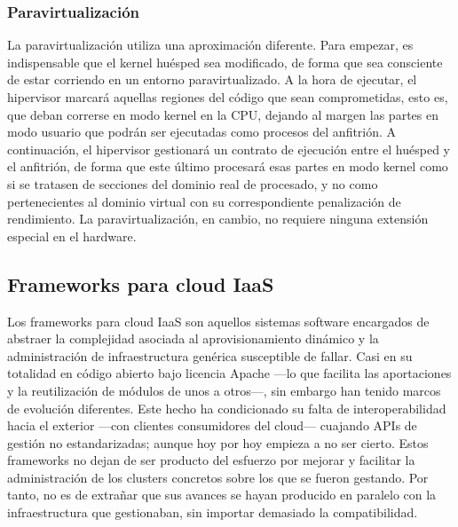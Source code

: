 \subsubsection{Paravirtualizaci\'on}\label{subsubsec:paravirt}

\noindent La paravirtualizaci\'on utiliza una aproximaci\'on diferente. Para empezar, es indispensable que el kernel hu\'esped sea modificado, de forma que sea consciente de estar corriendo en un entorno paravirtualizado. A la hora de ejecutar, el hipervisor marcar\'a aquellas regiones del c\'odigo que sean comprometidas, esto es, que deban correrse en modo kernel en la CPU, dejando al margen las partes en modo usuario que podr\'an ser ejecutadas como procesos del anfitri\'on. A continuaci\'on, el hipervisor gestionar\'a un contrato de ejecuci\'on entre el hu\'esped y el anfitri\'on, de forma que este \'ultimo procesar\'a esas partes en modo kernel como si se tratasen de secciones del dominio real de procesado, y no como pertenecientes al dominio virtual con su correspondiente penalizaci\'on de rendimiento. La paravirtualizaci\'on, en cambio, no requiere ninguna extensi\'on especial en el hardware.\newline


\subsection{Frameworks para cloud IaaS}\label{subsec:frameworksiaas}

\noindent Los frameworks para cloud IaaS son aquellos sistemas software encargados de abstraer la complejidad asociada al aprovisionamiento din\'amico y la administraci\'on de infraestructura gen\'erica susceptible de fallar. Casi en su totalidad en c\'odigo abierto bajo licencia Apache ---lo que facilita las aportaciones y la reutilizaci\'on de m\'odulos de unos a otros---, sin embargo han tenido marcos de evoluci\'on diferentes. Este hecho ha condicionado su falta de in\-te\-ro\-pe\-ra\-bi\-li\-dad hacia el exterior ---con clientes consumidores del cloud--- cuajando APIs de gesti\'on no estandarizadas; aunque hoy por hoy empieza a no ser cierto. Estos frameworks no dejan de ser producto del esfuerzo por mejorar y facilitar la administraci\'on de los clusters concretos sobre los que se fueron gestando. Por tanto, no es de extra\~nar que sus avances se hayan producido en paralelo con la infraestructura que gestionaban, sin importar demasiado la compatibilidad.\newline

